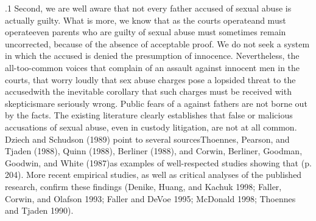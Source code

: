 \documentclass[11pt, twoside]{article}
\begin{document}
{\p.1{%
Second, we are well aware that not every father accused of sexual
abuse is actually guilty. What is more, we know that as the courts
operate\mdash{}and must operate\mdash{}even parents who are guilty of sexual
abuse must sometimes remain uncorrected, because of the absence of
acceptable proof. We do not seek a system in which the accused is denied the presumption of innocence. Nevertheless, the all-too-common
voices that complain of an assault against innocent men in the courts,
that worry loudly that sex abuse charges pose a lopsided threat to the
accused\mdash{}with the inevitable corollary that such charges must be received with skepticism\mdash{}are seriously wrong. Public fears of a  against fathers are not borne out by the facts. The existing literature clearly establishes that false or malicious accusations of sexual
abuse, even in custody litigation, are not at all common. Dziech and
Schudson (1989) point to several sources\mdash{}Thoennes, Pearson, and
Tjaden (1988), Quinn (1988), Berliner (1988), and Corwin, Berliner,
Goodman, Goodwin, and White (1987)\mdash{}as examples of well-respected
studies showing that  (p. 204). More
recent empirical studies, as well as critical analyses of the published research, confirm these findings (Denike, Huang, and Kachuk 1998; Faller,
Corwin, and Olafson 1993; Faller and DeVoe 1995; McDonald 1998;
Thoennes and Tjaden 1990).
}%

}
\end{document}
